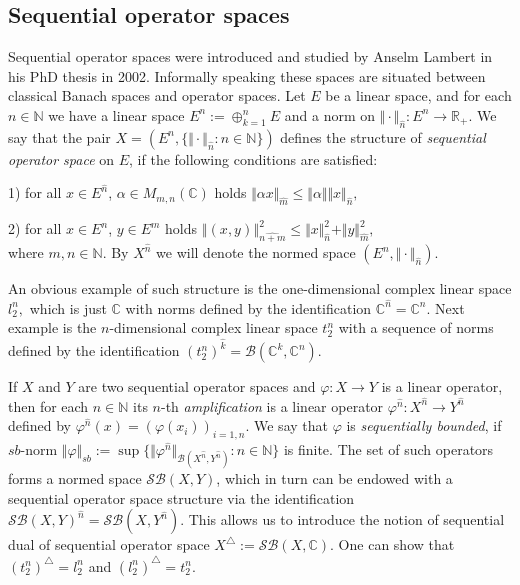 \documentclass[a0b,landscape]{a0poster}
\begin{document}
\begin{multicols}{4}
\section*{Sequential operator spaces}

Sequential operator spaces were introduced and studied by Anselm Lambert in his PhD thesis in 2002. Informally speaking these spaces are situated between classical Banach spaces and 
operator spaces. Let $E$ be a linear space, and for each $n\in\mathbb{N}$ we have a linear space $E^n:=\oplus_{k=1}^n E$ and a norm on $\Vert \cdot \Vert_{\widehat{n}}:E^n\to\mathbb{R}_+$.
We say that the pair $X = (E^n, \{\Vert \cdot \Vert_{\widehat{n}}:n\in\mathbb{N}\})$ defines the structure of \textit{sequential operator space} on $E$, if
the following conditions are satisfied:

1) for all $x \in E^{\widehat{n}}$, $\alpha \in M_{m, n}(\mathbb{C})$ holds
$
\Vert \alpha x \Vert_{\widehat{m}} \leq \Vert \alpha \Vert  \Vert x \Vert_{\widehat{n}},
$

2) for all $x \in E^n$, $y \in E^m$ holds
$
\left\Vert ( x, y ) \right\Vert^2_{\widehat{n + m}} \leq   \Vert x \Vert_{\widehat{n}}^2 + \Vert y \Vert_{\widehat{m}}^2,
$\\
where $m,n\in\mathbb{N}$. By $X^{\widehat{n}}$ we will denote the normed space $(E^n,\Vert \cdot \Vert_{\widehat{n}})$.

An obvious example of such structure is the one-dimensional complex linear space $l_2^n,$ which is just $\mathbb{C}$ with norms defined by the identification $\mathbb{C}^{\widehat{n}}=\mathbb{C}^n$. 
Next example is the $n$-dimensional complex linear space $t_2^n$ with a sequence of norms defined by the identification
$(t_2^n)^{\widehat{k}}=\mathcal{B}(\mathbb{C}^k,\mathbb{C}^n)$.

If $X$ and $Y$ are two sequential operator spaces and $\varphi : X \rightarrow Y$ is a linear operator, then for each $n\in\mathbb{N}$ its $n$-th \textit{amplification} is  
a linear operator $\varphi^{\widehat{n}} : X^{\widehat{n}} \to Y^{\widehat{n}}$ defined by $\varphi^{\widehat{n}}(x)=(\varphi(x_i))_{i=1,n}$. We say that $\varphi$ 
is \textit{sequentially bounded}, if $sb$-norm $\Vert \varphi \Vert_{sb} := \sup\{\Vert \varphi^{\widehat{n}}\Vert_{\mathcal{B}(X^{\widehat{n}},Y^{\widehat{n}})}:n\in\mathbb{N}\}$ 
is finite. The set of such operators forms a normed space $\mathcal{SB}(X,Y)$, which in turn can be endowed with a sequential operator space structure via the identification
$\mathcal{SB}(X,Y)^{\widehat{n}}=\mathcal{SB}(X,Y^{\widehat{n}})$. This allows us to introduce the notion of sequential dual of sequential operator space 
$X^\triangle:=\mathcal{SB}(X,\mathbb{C})$. One can show that $(t_2^n)^\triangle=l_2^n$ and $(l_2^n)^\triangle=t_2^n$.


\end{multicols}
\end{document}
